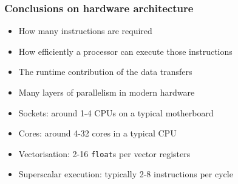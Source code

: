 \documentclass[dvipsnames,presentation,aspectratio=169,14pt]{beamer}
\begin{document}
\begin{frame}
  \frametitle{Conclusions on hardware architecture}
    \begin{itemize}
    \item How many instructions are required
    \item How efficiently a processor can execute those instructions
    \item The runtime contribution of the data transfers
    \end{itemize}
    \pause
    \vskip 8pt

    \begin{itemize}
    \item Many layers of parallelism in modern hardware
    \item Sockets: around 1-4 CPUs on a typical motherboard
    \item Cores: around 4-32 cores in a typical CPU
    \item Vectorisation: 2-16 \texttt{float}s per vector registers
    \item Superscalar execution: typically 2-8 instructions per cycle
    \end{itemize}
\end{frame}
\end{document}
